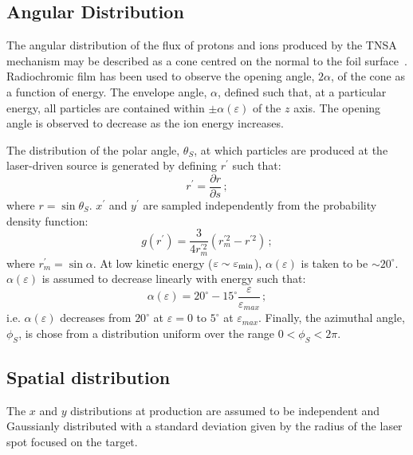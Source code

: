 \subsection{Angular Distribution}

The angular distribution of the flux of protons and ions produced by
the TNSA mechanism may be described as a cone centred on the normal to
the foil surface~\cite{10.1038/s41598-019-41705-0}.
Radiochromic film has been used to observe the opening angle,
$2\alpha$, of the cone as a function of energy.
The envelope angle, $\alpha$, defined such that, at a particular
energy, all particles are contained within $\pm\alpha(\varepsilon)$ of
the $z$ axis.
The opening angle is observed to decrease as the ion energy
increases.

The distribution of the polar angle, $\theta_S$, at which particles
are produced at the laser-driven source is generated by defining
$r^\prime$ such that:
\begin{equation}
  r^\prime = \frac{\partial r}{\partial s}\,;
\end{equation}
where $r=\sin\theta_S$.
$x^\prime$ and $y^\prime$ are sampled independently from the
probability density function:
\begin{equation}
  g(r^\prime) = \frac{3}{4r^{\prime 2}_m} \left(r^{\prime 2}_m-r^{\prime 2} \right)\,;
\end{equation}
where $r^\prime_m=\sin\alpha$.
At low kinetic energy ($\varepsilon \sim \varepsilon_{\rm min}$),
$\alpha(\varepsilon)$ is taken to be $\sim 20^\circ$.
$\alpha(\varepsilon)$ is assumed to decrease linearly with energy such
that:
\begin{equation}
  \alpha(\varepsilon) =
                20^\circ - 15^\circ \frac{\varepsilon}{\varepsilon_{max}} \, ;
  \label{Eq:sigVeps}
\end{equation}
i.e. $\alpha(\varepsilon)$ decreases from $20^\circ$ at $\varepsilon=0$
to $5^\circ$ at $\varepsilon_{max}$.
Finally, the azimuthal angle, $\phi_S$, is chose from a distribution
uniform over the range $0 < \phi_S < 2\pi$.

\subsection{Spatial distribution}

The $x$ and $y$ distributions at production are assumed to be
independent and Gaussianly distributed with a standard deviation given
by the radius of the laser spot focused on the target.

